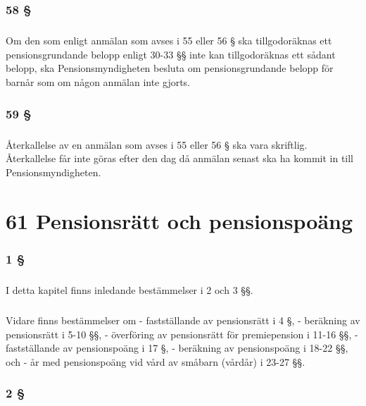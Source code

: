 \documentclass[a4paper,notitlepage,openany,10pt]{book}
\begin{document}
\subsection*{58 §}
\paragraph*{}
Om den som enligt anmälan som avses i 55 eller 56 § ska tillgodoräknas ett pensionsgrundande belopp enligt 30-33 §§ inte kan tillgodoräknas ett sådant belopp, ska Pensionsmyndigheten besluta om pensionsgrundande belopp för barnår som om någon anmälan inte gjorts.
\subsection*{59 §}
\paragraph*{}
Återkallelse av en anmälan som avses i 55 eller 56 § ska vara skriftlig. Återkallelse får inte göras efter den dag då anmälan senast ska ha kommit in till Pensionsmyndigheten.
\chapter*{61 Pensionsrätt och pensionspoäng}
\subsection*{1 §}
\paragraph*{}
I detta kapitel finns inledande bestämmelser i 2 och 3 §§.
\paragraph*{}
Vidare finns bestämmelser om
\newline - fastställande av pensionsrätt i 4 §,
\newline - beräkning av pensionsrätt i 5-10 §§,
\newline - överföring av pensionsrätt för premiepension i 11-16 §§,
\newline - fastställande av pensionspoäng i 17 §,
\newline - beräkning av pensionspoäng i 18-22 §§, och
\newline - år med pensionspoäng vid vård av småbarn (vårdår) i 23-27 §§.
\subsection*{2 §}
\end{document}
